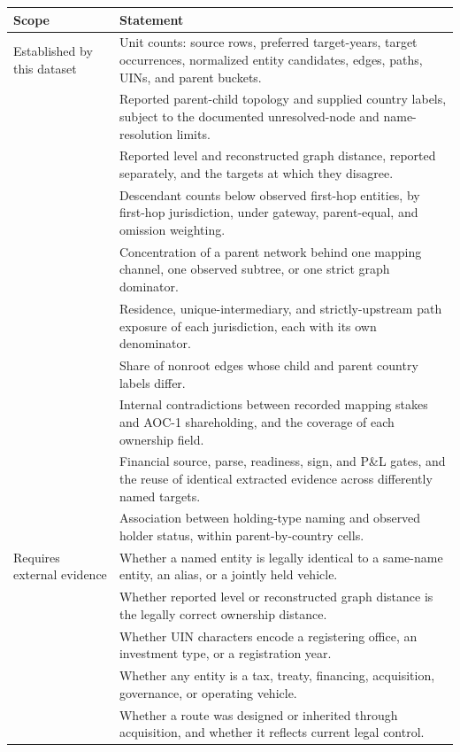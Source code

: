 \begin{tabular}{>{\raggedright\arraybackslash}p{}>{\raggedright\arraybackslash}p{}}
\toprule
Scope & Statement \\
\midrule
Established by this dataset & Unit counts: source rows, preferred target-years, target occurrences, normalized entity candidates, edges, paths, UINs, and parent buckets. \\
 & Reported parent-child topology and supplied country labels, subject to the documented unresolved-node and name-resolution limits. \\
 & Reported level and reconstructed graph distance, reported separately, and the targets at which they disagree. \\
 & Descendant counts below observed first-hop entities, by first-hop jurisdiction, under gateway, parent-equal, and omission weighting. \\
 & Concentration of a parent network behind one mapping channel, one observed subtree, or one strict graph dominator. \\
 & Residence, unique-intermediary, and strictly-upstream path exposure of each jurisdiction, each with its own denominator. \\
 & Share of nonroot edges whose child and parent country labels differ. \\
 & Internal contradictions between recorded mapping stakes and AOC-1 shareholding, and the coverage of each ownership field. \\
 & Financial source, parse, readiness, sign, and P\&L gates, and the reuse of identical extracted evidence across differently named targets. \\
 & Association between holding-type naming and observed holder status, within parent-by-country cells. \\
\midrule
Requires external evidence & Whether a named entity is legally identical to a same-name entity, an alias, or a jointly held vehicle. \\
 & Whether reported level or reconstructed graph distance is the legally correct ownership distance. \\
 & Whether UIN characters encode a registering office, an investment type, or a registration year. \\
 & Whether any entity is a tax, treaty, financing, acquisition, governance, or operating vehicle. \\
 & Whether a route was designed or inherited through acquisition, and whether it reflects current legal control. \\

\end{tabular}
